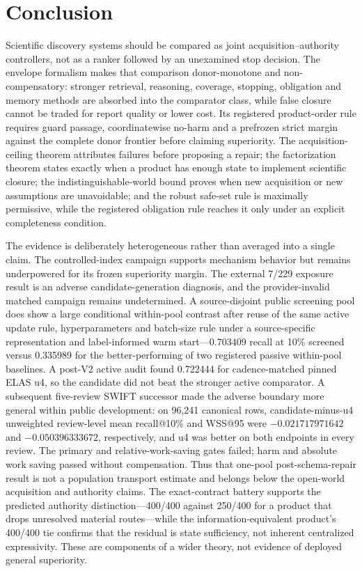 \documentclass[11pt]{article}
\theoremstyle{definition}
\begin{document}
\section{Conclusion}
Scientific discovery systems should be compared as joint
acquisition--authority controllers, not as a ranker followed by an unexamined
stop decision.  The envelope formalism makes that comparison donor-monotone and
non-compensatory: stronger retrieval, reasoning, coverage, stopping, obligation
and memory methods are absorbed into the comparator class, while false closure
cannot be traded for report quality or lower cost. Its registered product-order
rule requires guard passage, coordinatewise no-harm and a prefrozen strict
margin against the complete donor frontier before claiming superiority. The acquisition-ceiling
theorem attributes failures before proposing a repair; the factorization theorem
states exactly when a product has enough state to implement scientific closure;
the indistinguishable-world bound proves when new acquisition or new assumptions
are unavoidable; and the robust safe-set rule is maximally permissive, while the
registered obligation rule reaches it only under an explicit completeness
condition.

The evidence is deliberately heterogeneous rather than averaged into a single
claim.  The controlled-index campaign supports mechanism behavior but remains
underpowered for its frozen superiority margin.  The external 7/229 exposure
result is an adverse candidate-generation diagnosis, and the provider-invalid
matched campaign remains undetermined. A source-disjoint public screening pool
does show a large conditional within-pool contrast after reuse of the same
active update rule, hyperparameters and batch-size rule under a source-specific representation
and label-informed warm start---0.703409
recall at 10\% screened versus 0.335989 for the better-performing of two
registered passive within-pool baselines. A post-V2 active audit found 0.722444
for cadence-matched pinned ELAS u4, so the candidate did not beat the stronger
active comparator.  A subsequent five-review SWIFT successor made the adverse
boundary more general within public development: on 96,241 canonical rows,
candidate-minus-u4 unweighted review-level mean recall@10\% and WSS@95 were
$-0.021717971642$ and $-0.050396333672$, respectively, and u4 was better on
both endpoints in every review.  The primary and relative-work-saving gates
failed; harm and absolute work saving passed without compensation. Thus
that one-pool post-schema-repair result is not a population transport
estimate and belongs below the open-world acquisition
and authority claims.  The exact-contract battery supports the
predicted authority distinction---400/400 against 250/400 for a product that
drops unresolved material routes---while the information-equivalent product's
400/400 tie confirms that the residual is state sufficiency, not inherent
centralized expressivity.  These are components of a wider theory, not evidence
of deployed general superiority.
\end{document}
